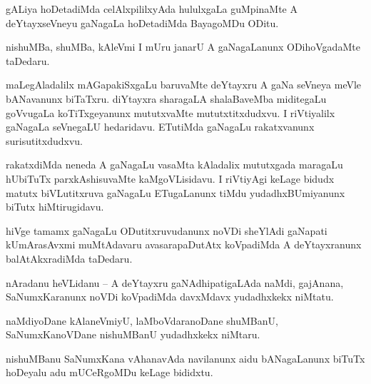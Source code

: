 \documentclass{article}
\begin{document}
\begin{mn}%
gALiya hoDetadiMda celAlxpililxyAda hululxgaLa guMpinaMte A deYtayxseVneyu gaNagaLa hoDetadiMda 
BayagoMDu ODitu.
\end{mn}

\begin{mn}%
nishuMBa, shuMBa, kAleVmi I mUru janarU A gaNagaLanunx ODihoVgadaMte taDedaru.
\end{mn}

\begin{mn}%
maLegAladalilx mAGapakiSxgaLu baruvaMte deYtayxru A gaNa seVneya meVle bANavanunx biTaTxru. 
diYtayxra sharagaLA shalaBaveMba miditegaLu goVvugaLa koTiTxgeyanunx mututxvaMte mututxtitxdudxvu. 
I riVtiyalilx gaNagaLa seVnegaLU hedaridavu. ETutiMda gaNagaLu rakatxvanunx surisutitxdudxvu.
\end{mn}

\begin{mn}%
rakatxdiMda neneda A gaNagaLu vasaMta kAladalix mututxgada maragaLu hUbiTuTx parxkAshisuvaMte 
kaMgoVLisidavu. I riVtiyAgi keLage bidudx matutx biVLutitxruva gaNagaLu ETugaLanunx tiMdu 
yudadhxBUmiyanunx biTutx hiMtirugidavu.
\end{mn}

\begin{mn}%
hiVge tamamx gaNagaLu ODutitxruvudanunx noVDi sheYlAdi gaNapati kUmArasAvxmi muMtAdavaru 
avasarapaDutAtx koVpadiMda A deYtayxranunx balAtAkxradiMda taDedaru.
\end{mn}


\begin{mn}%
nAradanu heVLidanu -- A deYtayxru gaNAdhipatigaLAda naMdi, gajAnana, SaNumxKaranunx noVDi 
koVpadiMda davxMdavx yudadhxkekx niMtatu.
\end{mn}

\begin{mn}%
naMdiyoDane kAlaneVmiyU, laMboVdaranoDane shuMBanU, SaNumxKanoVDane nishuMBanU yudadhxkekx niMtaru.
\end{mn}

\begin{mn}%
nishuMBanu SaNumxKana vAhanavAda navilanunx aidu bANagaLanunx biTuTx hoDeyalu adu mUCeRgoMDu keLage 
bididxtu.
\end{mn}
\end{document}
